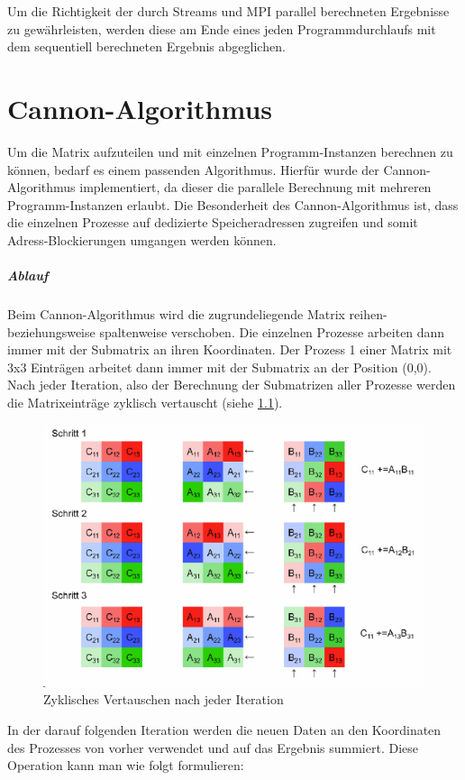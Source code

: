 \documentclass[
ngerman,
ruledheaders=section,
class=report,
thesis={type=Dokumentation},
ignore-missing-data=true,
accentcolor=9c,
custommargins=false,
marginpar=false,
parskip=half-,
fontsize=11pt,
]{tudapub}
\begin{document}
	Um die Richtigkeit der durch Streams und MPI parallel berechneten Ergebnisse zu gewährleisten, werden diese am Ende eines jeden Programmdurchlaufs mit dem sequentiell berechneten Ergebnis abgeglichen.
	
	\chapter{Cannon-Algorithmus}
	Um die Matrix aufzuteilen und mit einzelnen Programm-Instanzen berechnen zu können, bedarf es einem passenden Algorithmus. Hierfür wurde der Cannon-Algorithmus implementiert, da dieser die parallele Berechnung mit mehreren Programm-Instanzen erlaubt. Die Besonderheit des Cannon-Algorithmus ist, dass die einzelnen Prozesse auf dedizierte Speicheradressen zugreifen und somit Adress-Blockierungen umgangen werden können.
	
	\paragraph{Ablauf}
	Beim Cannon-Algorithmus wird die zugrundeliegende Matrix reihen- beziehungsweise spaltenweise verschoben. Die einzelnen Prozesse arbeiten dann immer mit der Submatrix an ihren Koordinaten. Der Prozess 1 einer Matrix mit 3x3 Einträgen arbeitet dann immer mit der Submatrix an der Position (0,0). Nach jeder Iteration, also der Berechnung der Submatrizen aller Prozesse werden die Matrixeinträge zyklisch vertauscht (siehe \ref{fig:cannon-steps}).
	
	\begin{figure}[H]
		\centering
		\includegraphics[width=0.7\linewidth]{content/cannon-steps}
		\caption{Zyklisches Vertauschen nach jeder Iteration}
		\label{fig:cannon-steps}
	\end{figure}
	
	In der darauf folgenden Iteration werden die neuen Daten an den Koordinaten des Prozesses von vorher verwendet und auf das Ergebnis summiert. Diese Operation kann man wie folgt formulieren:
	
\end{document}
